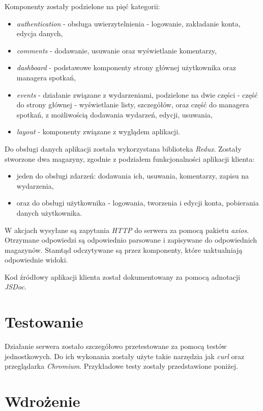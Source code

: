 \documentclass[12pt]{article}
\begin{document}
Komponenty zostały podzielone na pięć kategorii:
\begin{itemize}
\item \textit{authentication} - obsługa uwierzytelnienia - logowanie, zakładanie konta, edycja danych,
\item \textit{comments} - dodawanie, usuwanie oraz wyświetlanie komentarzy,
\item \textit{dashboard} - podstawowe komponenty strony głównej użytkownika oraz managera spotkań,
\item \textit{events} - działanie związane z wydarzeniami, podzielone na dwie części - część do strony głównej - wyświetlanie listy, szczegółów, oraz część do managera spotkań, z możliwością dodawania wydarzeń, edycji, usuwania,
\item \textit{layout} - komponenty związane z wyglądem aplikacji.
\end{itemize}

Do obsługi danych aplikacji została wykorzystana biblioteka \textit{Redux}. Zostały stworzone dwa magazyny, zgodnie z podziałem funkcjonalności aplikacji klienta: 
\begin{itemize}
\item jeden do obsługi zdarzeń: dodawania ich, usuwania, komentarzy, zapisu na wydarzenia,
\item oraz do obsługi użytkownika - logowania, tworzenia i edycji konta, pobierania danych użytkownika.
\end{itemize}

W akcjach wysyłane są zapytania \textit{HTTP} do serwera za pomocą pakietu \textit{axios}. Otrzymane odpowiedzi są odpowiednio parsowane i zapisywane do odpowiednich magazynów. Stamtąd odczytywane są przez komponenty, które uaktualniają odpowiednie widoki.

Kod źródłowy aplikacji klienta został dokumentowany za pomocą adnotacji \textit{JSDoc}.

\pagebreak
\section{Testowanie}

Działanie serwera zostało szczegółowo przetestowane za pomocą testów jednostkowych. Do ich wykonania zostały użyte takie narzędzia jak \textit{curl} oraz przeglądarka \textit{Chromium}. Przykładowe testy zostały przedstawione poniżej.

\pagebreak
\section{Wdrożenie}
\end{document}
